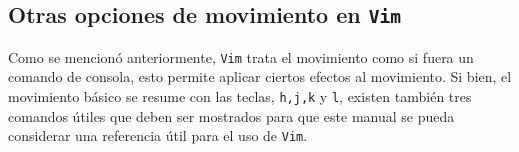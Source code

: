 \documentclass[10pt]{article}
\begin{document}
\subsection{Otras opciones de movimiento en \texttt{Vim}}
Como se mencionó anteriormente, \texttt{Vim} trata el movimiento como si fuera un comando de consola, esto permite aplicar ciertos efectos al movimiento.
Si bien, el movimiento básico se resume con las teclas, \texttt{h,j,k} y \texttt{l}, existen también tres comandos útiles que deben ser mostrados para que este manual se pueda considerar una referencia útil para el uso de \texttt{Vim}.  
\end{document}
